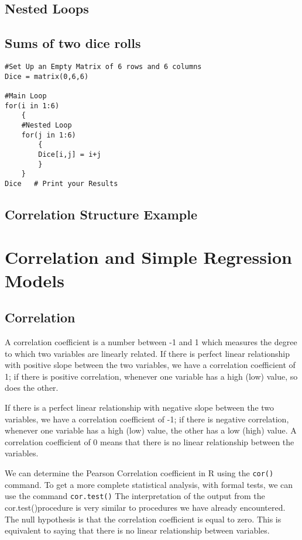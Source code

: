 \documentclass[a4paper,12pt]{article}
\begin{document}
\begin{itemize}
\begin{itemize}
\begin{framed}
\begin{verbatim}
\end{verbatim}
\end{framed}


\subsection{Nested Loops}

\subsection{Sums of two dice rolls}
\begin{framed}
\begin{verbatim}
#Set Up an Empty Matrix of 6 rows and 6 columns
Dice = matrix(0,6,6)

#Main Loop
for(i in 1:6)
	{
    #Nested Loop
	for(j in 1:6)
		{
		Dice[i,j] = i+j
		}
	}		
Dice   # Print your Results
\end{verbatim}
\end{framed}
\subsection{Correlation Structure Example}


\newpage
\section{Correlation and Simple Regression Models}

\subsection{Correlation}

A correlation coefficient is a number between -1 and 1 which measures the degree to which two variables are linearly related. If there is perfect linear relationship with positive slope between the two variables, we have a correlation coefficient of 1; if there is positive correlation, whenever one variable has a high (low) value, so does the other.

If there is a perfect linear relationship with negative slope between the two variables, we have a correlation coefficient of -1; if there is negative correlation, whenever one variable has a high (low) value, the other has a low (high) value.
A correlation coefficient of 0 means that there is no linear relationship between the variables.

We can determine the Pearson Correlation coefficient in R using the \texttt{cor()} command.
To get a more complete statistical analysis, with formal tests, we can use the command \texttt{cor.test()}
The interpretation of the output from the cor.test()procedure is very similar to procedures we have already encountered. The null hypothesis is that the correlation coefficient is equal to zero. This is equivalent to saying that there is no linear relationship between variables.



\end{itemize}
\end{itemize}
\end{document}
